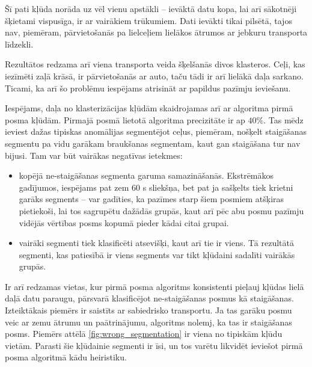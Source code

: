 \documentclass{ludis}
\begin{document}
Šī pati kļūda norāda uz vēl vienu apstākli -- ievāktā datu kopa, lai arī sākotnēji šķietami 
vispusīga, ir ar vairākiem trūkumiem. Dati ievākti tikai pilsētā, tajos nav, piemēram, pārvie\-tošanās
pa lielceļiem lielākos ātrumos ar jebkuru transporta līdzekli.

Rezultātos redzama arī viena transporta veida šķelšanās divos klasteros. Ceļi, kas iezīmēti zaļā
krāsā, ir pārvietošanās ar auto, taču tādi ir arī lielākā daļa sarkano. Ticami, ka arī šo
problēmu iespējams atrisināt ar papildus pazīmju ieviešanu.

Iespējams, daļa no klasterizācijas kļūdām skaidrojamas arī ar algoritma pirmā posma \linebreak kļūdām.
Pirmajā posmā lietotā algoritma precizitāte ir ap $40\%$. Tas mēdz ieviest dažas tipiskas anomālijas
segmentējot ceļus, piemēram, nošķelt staigāšanas segmentu pa vidu garākam 
\linebreak braukšanas segmentam, kaut gan staigāšana tur nav bijusi. Tam var būt vairākas
negatīvas ietekmes:
\begin{itemize}
\item kopējā ne-staigāšanas segmenta garuma samazināšanās. Ekstrēmākos gadījumos, ies\-pējams pat zem
  $60$ s sliekšņa, bet pat ja sašķelts tiek krietni garāks segments -- var gadīties, ka pazīmes
  starp šiem posmiem atšķiras pietiekoši, lai tos sagrupētu dažādās grupās, kaut arī pēc
  abu posmu pazīmju vidējās vērtības posms kopumā pieder kādai citai grupai.
\item vairāki segmenti tiek klasificēti atsevišķi, kaut arī tie ir viens. Tā rezultātā segmenti, kas
  patiesībā ir viens segments var tikt kļūdaini sadalīti vairākās grupās.
\end{itemize}

Ir arī redzamas vietas, kur pirmā posma algoritms konsistenti pieļauj kļūdas lielā daļā datu
paraugu, pārsvarā klasificējot ne-staigāšanas posmus kā staigāšanas. Izteiktākais piemērs ir 
saistīts ar sabiedrisko transportu. Ja tas garāku posmu veic ar zemu ātrumu un paātrinājumu,
algoritms nolemj, ka tas ir staigāšanas posms. Piemērs attēlā \ref{fig:wrong_segmentation} ir viena
no tipiskām kļūdu vietām. Parasti šie kļūdainie segmenti ir īsi, un tos varētu likvidēt ieviešot
pirmā posma algo\-ritmā kādu heiristiku.
\end{document}

